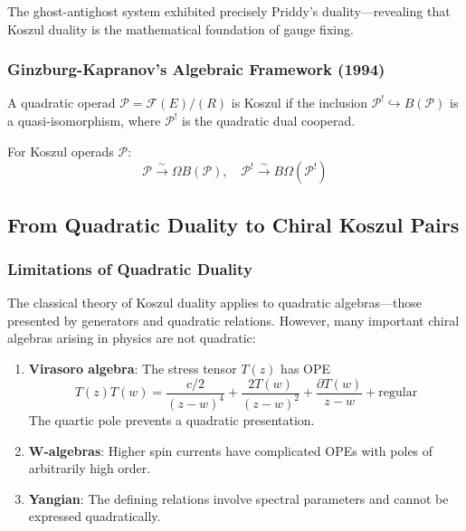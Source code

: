 The ghost-antighost system exhibited precisely Priddy's duality—revealing that Koszul duality is the mathematical foundation of gauge fixing.

\subsubsection{Ginzburg-Kapranov's Algebraic Framework (1994)}

\begin{definition}
A quadratic operad $\mathcal{P} = \mathcal{F}(E)/(R)$ is Koszul if the inclusion $\mathcal{P}^! \hookrightarrow B(\mathcal{P})$ is a quasi-isomorphism, where $\mathcal{P}^!$ is the quadratic dual cooperad.
\end{definition}

\begin{theorem}
For Koszul operads $\mathcal{P}$:
$$\mathcal{P} \xrightarrow{\sim} \Omega B(\mathcal{P}), \quad \mathcal{P}^! \xrightarrow{\sim} B\Omega(\mathcal{P}^!)$$
\end{theorem}


\subsection{From Quadratic Duality to Chiral Koszul Pairs}

\subsubsection{Limitations of Quadratic Duality}

The classical theory of Koszul duality applies to quadratic algebras—those presented by generators and quadratic relations. However, many important chiral algebras arising in physics are not quadratic:

\begin{example}
\begin{enumerate}
\item \textbf{Virasoro algebra}: The stress tensor $T(z)$ has OPE
$$T(z)T(w) = \frac{c/2}{(z-w)^4} + \frac{2T(w)}{(z-w)^2} + \frac{\partial T(w)}{z-w} + \text{regular}$$
The quartic pole prevents a quadratic presentation.

\item \textbf{W-algebras}: Higher spin currents have complicated OPEs with poles of arbitrarily high order.

\item \textbf{Yangian}: The defining relations involve spectral parameters and cannot be expressed quadratically.
\end{enumerate}
\end{example}

